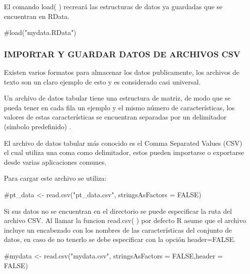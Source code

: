 \documentclass[
  letterpaper,
  DIV=11,
  numbers=noendperiod]{scrartcl}
\newenvironment{Shaded}{\begin{snugshade}}{\end{snugshade}}
\newcommand{\CommentTok}[1]{\textcolor[rgb]{0.37,0.37,0.37}{#1}}
\begin{document}
El comando load( ) recreará las estructuras de datos ya guardadas que se
encuentran en RData.

\begin{Shaded}
\begin{Highlighting}[]
\CommentTok{\#load("mydata.RData")}
\end{Highlighting}
\end{Shaded}

\hypertarget{importar-y-guardar-datos-de-archivos-csv}{%
\subsubsection{IMPORTAR Y GUARDAR DATOS DE ARCHIVOS
CSV}\label{importar-y-guardar-datos-de-archivos-csv}}

Existen varios formatos para almacenar los datos publicamente, los
archivos de texto son un claro ejemplo de esto y es considerado casi
universal.

Un archivo de datos tabular tiene una estructura de matriz, de modo que
se pueda tener en cada fila un ejemplo y el mismo número de
características, los valores de estas características se encuentran
separadas por un delimitador (símbolo predefinido) .

El archivo de datos tabular más conocido es el Comma Separated Values
(CSV) el cual utiliza una coma como delimitador, estos pueden importarse
o exportarse desde varias aplicaciones comunes.

Para cargar este archivo se utiliza:

\begin{Shaded}
\begin{Highlighting}[]
\CommentTok{\#pt\_data \textless{}{-} read.csv("pt\_data.csv", stringsAsFactors = FALSE)}
\end{Highlighting}
\end{Shaded}

Si sus datos no se encuentran en el directorio se puede especificar la
ruta del archivo CSV. Al llamar la funcion read.csv( ) por defecto R
asume que el archivo incluye un encabezado con los nombres de las
características del conjunto de datos, en caso de no tenerlo se debe
especificar con la opción header=FALSE.

\begin{Shaded}
\begin{Highlighting}[]
\CommentTok{\#mydata \textless{}{-} read.csv("mydata.csv", stringsAsFactors = FALSE,header = FALSE)}
\end{Highlighting}
\end{Shaded}
\end{document}

